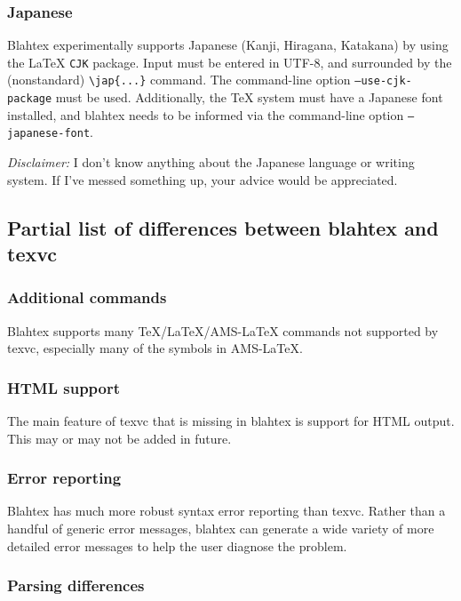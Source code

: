 \documentclass{article}
\newcommand{\texcommand}[1]{\textbackslash{}#1}
\begin{document}
\subsubsection{Japanese}

Blahtex experimentally supports Japanese (Kanji, Hiragana, Katakana) by using the \LaTeX{} \texttt{CJK} package. Input must be entered in UTF-8, and surrounded by the (nonstandard) \texttt{\texcommand{jap}\{...\}} command. The command-line option \texttt{--use-cjk-package} must be used. Additionally, the \TeX{} system must have a Japanese font installed, and blahtex needs to be informed via the command-line option \texttt{--japanese-font}.

\textit{Disclaimer:} I don't know anything about the Japanese language or writing system. If I've messed something up, your advice would be appreciated.


\subsection{Partial list of differences between blahtex and texvc}

\subsubsection{Additional commands}

Blahtex supports many \TeX/\LaTeX/AMS-\LaTeX{} commands not supported by texvc, especially many of the symbols in AMS-\LaTeX.

\subsubsection{HTML support}

The main feature of texvc that is missing in blahtex is support for HTML output. This may or may not be added in future.

\subsubsection{Error reporting}

Blahtex has much more robust syntax error reporting than texvc. Rather than a handful of generic error messages, blahtex can generate a wide variety of more detailed error messages to help the user diagnose the problem.

\subsubsection{Parsing differences}
\end{document}
